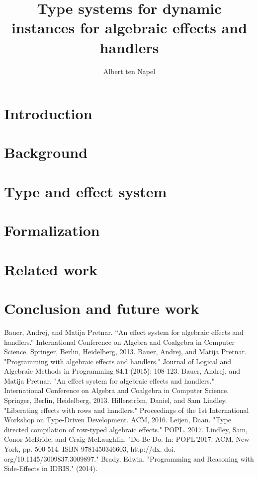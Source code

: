 \documentclass[12pt]{book}
\title{Type systems for dynamic instances for algebraic effects and handlers}
\author{Albert ten Napel}
\date{}
\begin{document}
\maketitle

\tableofcontents
\newpage

\chapter{Introduction}


\chapter{Background}



\chapter{Type and effect system}



\chapter{Formalization}


\chapter{Related work}


\chapter{Conclusion and future work}


\newpage
\begin{thebibliography}{9}
Bauer, Andrej, and Matija Pretnar. ``An effect system for algebraic effects and handlers.'' International Conference on Algebra and Coalgebra in Computer Science. Springer, Berlin, Heidelberg, 2013.
Bauer, Andrej, and Matija Pretnar. "Programming with algebraic effects and handlers." Journal of Logical and Algebraic Methods in Programming 84.1 (2015): 108-123.
Bauer, Andrej, and Matija Pretnar. "An effect system for algebraic effects and handlers." International Conference on Algebra and Coalgebra in Computer Science. Springer, Berlin, Heidelberg, 2013.
Hillerstr\"{o}m, Daniel, and Sam Lindley. "Liberating effects with rows and handlers." Proceedings of the 1st International Workshop on Type-Driven Development. ACM, 2016.
Leijen, Daan. "Type directed compilation of row-typed algebraic effects." POPL. 2017.
Lindley, Sam, Conor McBride, and Craig McLaughlin. "Do Be Do. In: POPL'2017. ACM, New York, pp. 500-514. ISBN 9781450346603, http://dx. doi. org/10.1145/3009837.3009897."
Brady, Edwin. "Programming and Reasoning with Side-Effects in IDRIS." (2014).
\end{thebibliography}
\end{document}
